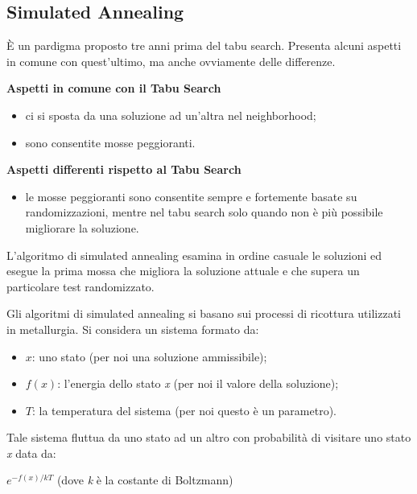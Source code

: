 \documentclass[11pt, oneside]{book}
\begin{document}
\subsection{Simulated Annealing}

\`E un pardigma proposto tre anni prima del tabu search. Presenta
alcuni aspetti in comune con quest'ultimo, ma anche ovviamente delle
differenze.

\par\bigskip

{\bf Aspetti in comune con il Tabu Search}

\begin{itemize}
\item ci si sposta da una soluzione ad un'altra nel neighborhood;
\item sono consentite mosse peggioranti.
\end{itemize}

{\bf Aspetti differenti rispetto al Tabu Search}

\begin{itemize}
\item le mosse peggioranti sono consentite sempre e fortemente basate
  su randomizzazioni, mentre nel tabu search solo quando non \`e pi\`u
  possibile migliorare la soluzione.

\end{itemize}

L'algoritmo di simulated annealing esamina in ordine casuale le
soluzioni ed esegue la prima mossa che migliora la soluzione attuale e
che supera un particolare test randomizzato.

\par\bigskip

Gli algoritmi di simulated annealing si basano sui processi di
ricottura utilizzati in metallurgia. Si considera un sistema formato
da:

\begin{itemize}
\item $x$: uno stato (per noi una soluzione ammissibile);
\item $f(x)$: l'energia dello stato {\em x} (per noi il valore della
  soluzione);
\item $T$: la temperatura del sistema (per noi questo \`e un
  parametro).
\end{itemize}

Tale sistema fluttua da uno stato ad un altro con probabilit\`a di
visitare uno stato {\em x} data da: 

\begin{center}
$e^{-f(x)/kT}$ (dove {\em k} \`e la costante di Boltzmann)
\end{center}
\end{document}
